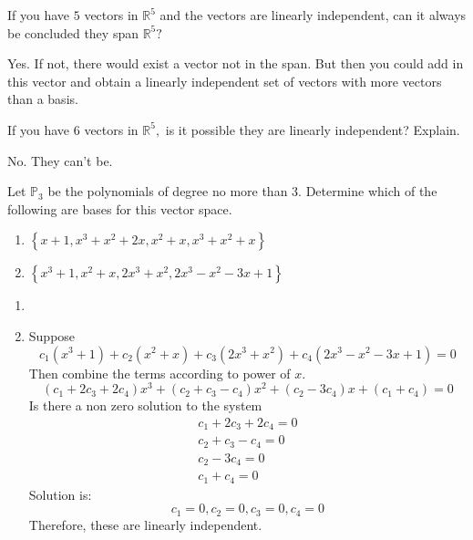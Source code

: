 \documentclass{ximera}
\begin{document}
\begin{problem}\label{prb:10.56} If you have $5$ vectors in $\mathbb{R}^{5}$ and the vectors are
linearly independent, can it always be concluded they span $\mathbb{R}^{5}?$
\begin{hint}
Yes. If not, there would exist a vector not in the span. But then
you could add in this vector and obtain a linearly independent set of
vectors with more vectors than a basis.
\end{hint}
\end{problem}

\begin{problem}\label{prb:10.57} If you have $6$ vectors in $\mathbb{R}^{5},$ is it possible they are
linearly independent? Explain.
\begin{hint}
No. They can't be.
\end{hint}
\end{problem}

\begin{problem}\label{prb:10.58} Let $\mathbb{P}_3$ be the polynomials of degree no more than 3. Determine which
of the following are bases for this vector space.

\begin{enumerate}
\item $\left\{ x+1,x^{3}+x^{2}+2x,x^{2}+x,x^{3}+x^{2}+x\right\} $

\item $\left\{ x^{3}+1,x^{2}+x,2x^{3}+x^{2},2x^{3}-x^{2}-3x+1\right\} $
\end{enumerate}

\begin{hint}
\begin{enumerate}
\item
\item
Suppose
\[
c_{1}\left( x^{3}+1\right) +c_{2}\left( x^{2}+x\right) +c_{3}\left(
2x^{3}+x^{2}\right) +c_{4}\left( 2x^{3}-x^{2}-3x+1\right) =0
\]
Then combine the terms according to power of $x.$
\[
\left( c_{1}+2c_{3}+2c_{4}\right) x^{3}+\left( c_{2}+c_{3}-c_{4}\right)
x^{2}+\left( c_{2}-3c_{4}\right) x+\left( c_{1}+c_{4}\right) =0
\]
Is there a non zero solution to the system 
$$\begin{array}{c}
c_{1}+2c_{3}+2c_{4}=0 \\
c_{2}+c_{3}-c_{4}=0 \\
c_{2}-3c_{4}=0 \\
c_{1}+c_{4}=0
\end{array}$$
Solution is:
\[
c_{1}=0,c_{2}=0,c_{3}=0,c_{4}=0
\]
Therefore, these are linearly independent.
\end{enumerate}
\end{hint}
\end{problem}
\end{document}
